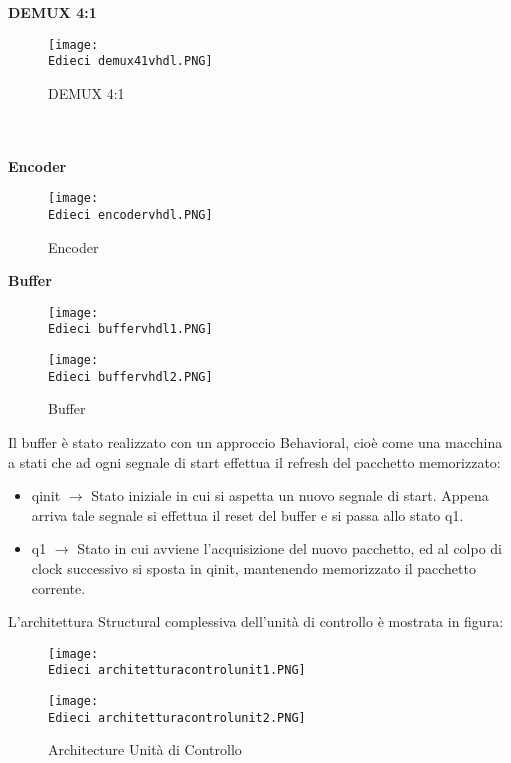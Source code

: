 \documentclass[12pt]{article}
\def \Edieci {Allegati/Esercizio10/}
\begin{document}
\clearpage
{\large \textbf{DEMUX 4:1}}
\begin{figure}[ht!]
    \centering
    \texttt{[image: \\Edieci demux41vhdl.PNG]}
    \caption{DEMUX 4:1}
\end{figure}
\\\\{\large \textbf{Encoder}}
\begin{figure}[ht!]
    \centering
    \texttt{[image: \\Edieci encodervhdl.PNG]}
    \caption{Encoder}
\end{figure}
\clearpage
{\large \textbf{Buffer}}
\begin{figure}[ht!]
    \texttt{[image: \\Edieci buffervhdl1.PNG]}
\end{figure}
\begin{figure}[ht!]
    \texttt{[image: \\Edieci buffervhdl2.PNG]}
    \caption{Buffer}
\end{figure}
\newpage
Il buffer è stato realizzato con un approccio Behavioral, cioè come una macchina a stati che ad ogni segnale di start effettua il refresh del pacchetto memorizzato:
\begin{itemize}
    \item qinit $\rightarrow$ Stato iniziale in cui si aspetta un nuovo segnale di start. Appena arriva tale segnale si effettua il reset del buffer e si passa allo stato q1.
    \item q1 $\rightarrow$ Stato in cui avviene l’acquisizione del nuovo pacchetto, ed al colpo di clock successivo si sposta in qinit, mantenendo memorizzato il pacchetto corrente.
\end{itemize}
L’architettura Structural complessiva dell’unità di controllo è mostrata in figura:
\begin{figure}[ht!]
    \centering
    \texttt{[image: \\Edieci architetturacontrolunit1.PNG]}    
\end{figure}
\begin{figure}[ht!]
    \centering
    \texttt{[image: \\Edieci architetturacontrolunit2.PNG]}    
    \caption{Architecture Unità di Controllo}
\end{figure}
\clearpage
\end{document}
